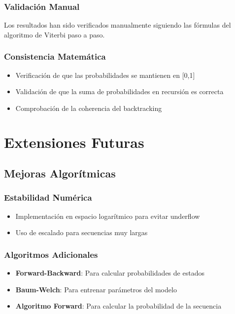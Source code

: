 \documentclass[
]{article}
\providecommand{\tightlist}{%
  \setlength{\itemsep}{0pt}\setlength{\parskip}{0pt}}
\begin{document}
\subsubsection{Validación Manual}\label{validaciuxf3n-manual}

Los resultados han sido verificados manualmente siguiendo las fórmulas
del algoritmo de Viterbi paso a paso.

\subsubsection{Consistencia
Matemática}\label{consistencia-matemuxe1tica}

\begin{itemize}
\tightlist
\item
  Verificación de que las probabilidades se mantienen en {[}0,1{]}
\item
  Validación de que la suma de probabilidades en recursión es correcta
\item
  Comprobación de la coherencia del backtracking
\end{itemize}

\section{Extensiones Futuras}\label{extensiones-futuras}

\subsection{Mejoras Algorítmicas}\label{mejoras-algoruxedtmicas}

\subsubsection{Estabilidad Numérica}\label{estabilidad-numuxe9rica}

\begin{itemize}
\tightlist
\item
  Implementación en espacio logarítmico para evitar underflow
\item
  Uso de escalado para secuencias muy largas
\end{itemize}

\subsubsection{Algoritmos Adicionales}\label{algoritmos-adicionales}

\begin{itemize}
\tightlist
\item
  \textbf{Forward-Backward}: Para calcular probabilidades de estados
\item
  \textbf{Baum-Welch}: Para entrenar parámetros del modelo
\item
  \textbf{Algoritmo Forward}: Para calcular la probabilidad de la
  secuencia
\end{itemize}
\end{document}
